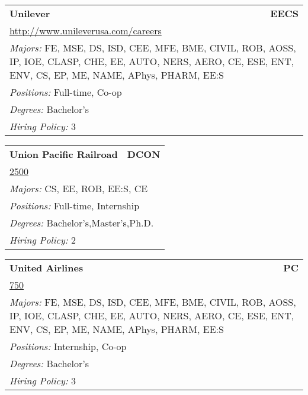 \documentclass[twoside]{article}
\begin{document}
\begin{center}
\begin{multicols}{3}
\begin{FlushLeft}
\begin{minipage}{\columnwidth}\begin{tabularx}{.95\columnwidth}{Xr}
                 {\Large\bf Unilever} & {\Large\bf EECS}\\
    \multicolumn{2}{p{.95\columnwidth}}{\url{http://www.unileverusa.com/careers}}\\
    \multicolumn{2}{p{.95\columnwidth}}{\emph{Majors:} FE, MSE, DS, ISD, CEE, MFE, BME, CIVIL, ROB, AOSS, IP, IOE, CLASP, CHE, EE, AUTO, NERS, AERO, CE, ESE, ENT, ENV, CS, EP, ME, NAME, APhys, PHARM, EE:S}\\
    \multicolumn{2}{p{.95\columnwidth}}{\emph{Positions:} Full-time, Co-op}\\
    \multicolumn{2}{p{.95\columnwidth}}{\emph{Degrees:} Bachelor's}\\
    \multicolumn{2}{p{.95\columnwidth}}{\emph{Hiring Policy:} 3}\\
    \end{tabularx}
    
\end{minipage}
 
\begin{minipage}{\columnwidth}\begin{tabularx}{.95\columnwidth}{Xr}
                 {\Large\bf Union Pacific Railroad} & {\Large\bf DCON}\\
    \multicolumn{2}{p{.95\columnwidth}}{\url{2500}}\\
    \multicolumn{2}{p{.95\columnwidth}}{\emph{Majors:} CS, EE, ROB, EE:S, CE}\\
    \multicolumn{2}{p{.95\columnwidth}}{\emph{Positions:} Full-time, Internship}\\
    \multicolumn{2}{p{.95\columnwidth}}{\emph{Degrees:} Bachelor's,Master's,Ph.D.}\\
    \multicolumn{2}{p{.95\columnwidth}}{\emph{Hiring Policy:} 2}\\
    \end{tabularx}
    
\end{minipage}
 
\begin{minipage}{\columnwidth}\begin{tabularx}{.95\columnwidth}{Xr}
                 {\Large\bf United Airlines} & {\Large\bf PC}\\
    \multicolumn{2}{p{.95\columnwidth}}{\url{750}}\\
    \multicolumn{2}{p{.95\columnwidth}}{\emph{Majors:} FE, MSE, DS, ISD, CEE, MFE, BME, CIVIL, ROB, AOSS, IP, IOE, CLASP, CHE, EE, AUTO, NERS, AERO, CE, ESE, ENT, ENV, CS, EP, ME, NAME, APhys, PHARM, EE:S}\\
    \multicolumn{2}{p{.95\columnwidth}}{\emph{Positions:} Internship, Co-op}\\
    \multicolumn{2}{p{.95\columnwidth}}{\emph{Degrees:} Bachelor's}\\
    \multicolumn{2}{p{.95\columnwidth}}{\emph{Hiring Policy:} 3}\\
    \end{tabularx}
    

\end{minipage}
\end{FlushLeft}
\end{multicols}
\end{center}
\end{document}
